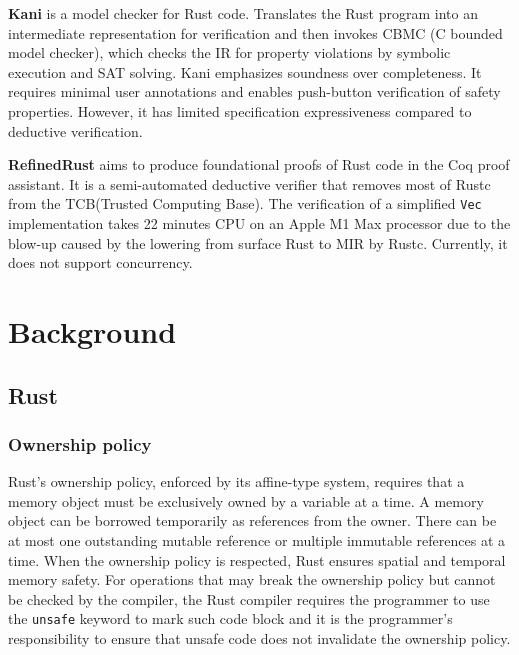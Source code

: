 \documentclass[conference]{IEEEtran}
\begin{document}
\textbf{Kani}\cite{kani} is a model checker for Rust code. Translates the Rust program into an intermediate representation for verification and then invokes CBMC (C bounded model checker)\cite{kroening2023cbmccboundedmodel}, which checks the IR for property violations by symbolic execution and SAT solving. Kani emphasizes soundness over completeness. It requires minimal user annotations and enables push-button verification of safety properties. However, it has limited specification expressiveness compared to deductive verification.   

\textbf{RefinedRust}\cite{RefinedRust} aims to produce foundational proofs of Rust code in the Coq proof assistant. It is a semi-automated deductive verifier that removes most of Rustc from the TCB(Trusted Computing Base). The verification of a simplified \texttt{Vec} implementation takes 22 minutes CPU on an Apple M1 Max processor due to the blow-up caused by the lowering from surface Rust to MIR by Rustc. Currently, it does not support concurrency.       




\section{Background}

\subsection{Rust}
\subsubsection{Ownership policy}
Rust's ownership policy, enforced by its affine-type system, requires that a memory object must be exclusively owned by a variable at a time. A memory object can be borrowed temporarily as references from the owner. There can be at most one outstanding mutable reference or multiple immutable references at a time. When the ownership policy is respected, Rust ensures spatial and temporal memory safety. For operations that may break the ownership policy but cannot be checked by the compiler, the Rust compiler requires the programmer to use the \texttt{unsafe} keyword to mark such code block and it is the programmer's responsibility to ensure that unsafe code does not invalidate the ownership policy.      
\end{document}
